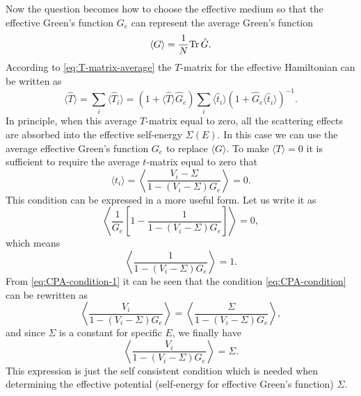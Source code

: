 \documentclass{book}
\newcommand{\average}[1]{\langle#1\rangle}
\newcommand{\Tr}{{\rm Tr}}
\numberwithin{equation}{section}
\begin{document}
Now the question becomes how to choose the effective medium so that
the effective Green's function $G_e$ can represent the average
Green's function 
\begin{equation}
  \average{G}=\frac{1}{N}\Tr\,\hat{G}.
\end{equation}
According to \eqref{eq:T-matrix-average} the $T$-matrix for the
effective Hamiltonian can be written as
\begin{equation}
  \average{\hat{T}}=\sum_i\average{\hat{T}_i}=
  (1+\average{\hat{T}}\hat{G}_e)\sum_i\average{\hat{t}_i}
  (1+\hat{G}_e\average{\hat{t}_i})^{-1}.
\end{equation}
In principle, when this average $T$-matrix equal to zero, all the
scattering effects are absorbed into the effective self-energy
$\Sigma(E)$. In this case we can use the average effective Green's
function $G_e$ to replace $\average{G}$. To make $\average{T}=0$ it is
sufficient to require the average $t$-matrix equal to zero that
\begin{equation}
  \label{eq:CPA-condition}
  \average{t_i}=\left\langle\frac{V_i-\Sigma}{1-(V_i-\Sigma)G_e}\right\rangle=0.
\end{equation}
This condition can be expressed in a more useful form. Let us write it as
\begin{equation}
  \left\langle\frac{1}{G_e}\left[1-\frac{1}{1-(V_i-\Sigma)G_e}\right]\right\rangle=0,
\end{equation}
which means 
\begin{equation}
  \label{eq:CPA-condition-1}
  \left\langle\frac{1}{1-(V_i-\Sigma)G_e}\right\rangle=1.
\end{equation}
From \eqref{eq:CPA-condition-1} it can be seen that the condition
\eqref{eq:CPA-condition} can be rewritten as
\begin{equation}
  \left\langle\frac{V_i}{1-(V_i-\Sigma)G_e}\right\rangle=
  \left\langle\frac{\Sigma}{1-(V_i-\Sigma)G_e}\right\rangle,
\end{equation}
and since $\Sigma$ is a constant for specific $E$, we finally have
\begin{equation}
  \label{eq:CPA-condition-2}
  \left\langle\frac{V_i}{1-(V_i-\Sigma)G_e}\right\rangle=\Sigma.
\end{equation}
This expression is just the self consistent condition which is needed
when determining the effective potential (self-energy for effective
Green's function) $\Sigma$.
\end{document}
